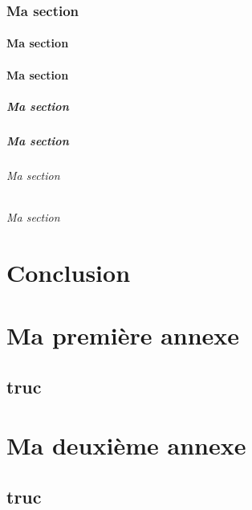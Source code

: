 \documentclass[bare]{polytech/polytech}
\begin{document}
\subsection{Ma section}
\lipsum[1-5]
\subsubsection{Ma section}
\lipsum[1-5]
\subsubsection{Ma section}
\lipsum[1-5]
\paragraph{Ma section}
\lipsum[1-5]
\paragraph{Ma section}
\lipsum[1-5]
\subparagraph{Ma section}
\lipsum[1-5]
\subparagraph{Ma section}
\lipsum[1-5]
  
\chapter*{Conclusion}

\lipsum[1-2]

\appendix   

\chapter{Ma première annexe}

\lipsum[1-4]

\section{truc}

\lipsum[1-4]
 
\chapter{Ma deuxième annexe}
  

\section{truc}

\lipsum[1-4]
\end{document}
